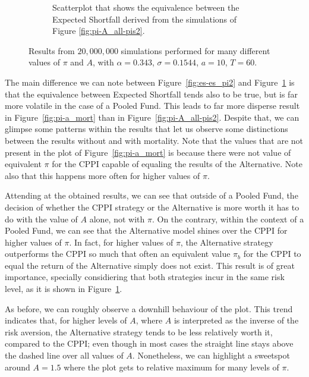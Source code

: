 \begin{figure}
\begin{subfigure}{.5\textwidth}
    \caption{Scatterplot that shows the equivalence between the Expected Shortfall derived from the simulations of Figure \ref{fig:pi-A_all-pis2}.}
    \label{fig:es-es_mort}
\end{subfigure}
\caption{Results from $20,000,000$ simulations performed for many different values of $\pi$ and $A$, with $\alpha = 0.343$, $\sigma = 0.1544$, $a = 10$, $T = 60$.}
\label{fig:compare_mort}
\end{figure}

The main difference we can note between Figure~\ref{fig:es-es_pi2} and Figure~\ref{fig:es-es_mort} is that the equivalence between Expected Shortfall tends also to be true, but is far more volatile in the case of a Pooled Fund. This leads to far more disperse result in Figure~\ref{fig:pi-a_mort} than in Figure~\ref{fig:pi-A_all-pis2}. Despite that, we can glimpse some patterns within the results that let us observe some distinctions between the results without and with mortality. Note that the values that are not present in the plot of Figure~\ref{fig:pi-a_mort} is because there were not value of equivalent $\pi$ for the CPPI capable of equaling the results of the Alternative. Note also that this happens more often for higher values of $\pi$.

Attending at the obtained results, we can see that outside of a Pooled Fund, the decision of whether the CPPI strategy or the Alternative is more worth it has to do with the value of $A$ alone, not with $\pi$. On the contrary, within the context of a Pooled Fund, we can see that the Alternative model shines over the CPPI for higher values of $\pi$. In fact, for higher values of $\pi$, the Alternative strategy outperforms the CPPI so much that often an equivalent value $\pi_b$ for the CPPI to equal the return of the Alternative simply does not exist. This result is of great importance, specially considiering that both strategies incur in the same risk level, as it is shown in Figure~\ref{fig:es-es_mort}.

As before, we can roughly observe a downhill behaviour of the plot.  This trend indicates that, for higher levels of $A$, where $A$ is interpreted as the inverse of the risk aversion, the Alternative strategy tends to be less relatively worth it, compared to the CPPI; even though in most cases the straight line stays above the dashed line over all values of $A$. Nonetheless, we can highlight a sweetspot around $A = 1.5$ where the plot gets to relative maximum for many levels of $\pi$.




